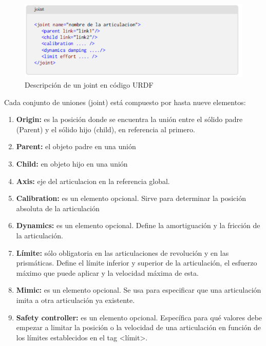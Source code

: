                                         \newpage

        
        \begin{figure}[htb]
            \centering
            \includegraphics[width=1.0\linewidth]{Main/Chapter3/Images3/3-8/codigo-joint.png}
            \caption{Descripción de un joint en código URDF}
            \label{f:Cap3-8_nose_nose}
        \end{figure} 
        
        Cada conjunto de uniones (joint) está compuesto por hasta nueve elementos:
        
         \begin{enumerate}      
            \item \textbf{Origin:} es la posición donde se encuentra la unión entre el sólido padre (Parent) y el sólido hijo (child), en referencia al primero.
            \item \textbf{Parent:} el objeto padre en una unión
            \item \textbf{Child:} en objeto hijo en una unión
            \item \textbf{Axis:} eje del articulacion en la referencia global.
            \item \textbf{Calibration:} es un elemento opcional. Sirve para determinar la posición absoluta de la articulación
            \item \textbf{Dynamics:} es un elemento opcional. Define la amortiguación y la fricción de la articulación.
            \item \textbf{Límite:} sólo obligatoria en las articulaciones de revolución y en las prismáticas. Define el límite inferior y superior de la articulación, el esfuerzo máximo que puede aplicar y la velocidad máxima de esta.
            \item \textbf{Mimic:} es un elemento opcional. Se usa para especificar que una articulación imita a otra articulación ya existente. 
            \item \textbf{Safety controller:} es un elemento opcional. Específica para qué valores debe empezar a limitar la posición o la velocidad de una articulación en función de los límites establecidos en el tag <límit>.
        \end{enumerate}
        
